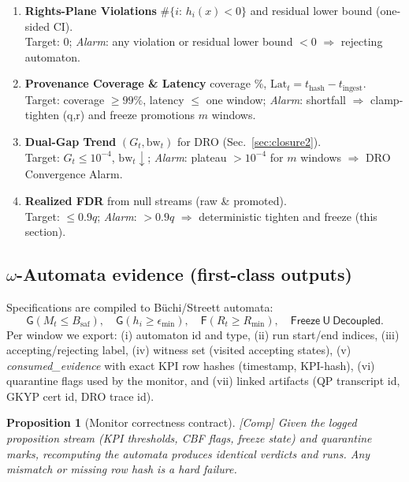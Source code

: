 \documentclass[10pt]{article}
\newcommand{\cutq}{q}
\newcommand{\layertag}[1]{\textup{[#1]}}
\newtheorem{proposition}{Proposition}
\begin{document}
\begin{constbox}
\begin{enumerate}[leftmargin=*]
Target: $0$ chatter; \emph{Alarm}: any violation $\Rightarrow$ switching-stability action (Sec.~\ref{thm:switch-stab}).
\item \textbf{Rights-Plane Violations} $\#\{i:\,h_i(x)<0\}$ and residual lower bound (one-sided CI). \\
Target: $0$; \emph{Alarm}: any violation or residual lower bound $<0$ $\Rightarrow$ rejecting automaton.
\item \textbf{Provenance Coverage \& Latency} coverage \%, $\mathrm{Lat}_t=t_{\text{hash}}{-}t_{\text{ingest}}$. \\
Target: coverage $\ge99\%$, latency $\le$ one window; \emph{Alarm}: shortfall $\Rightarrow$ clamp-tighten (q,r) and freeze promotions $m$ windows.
\item \textbf{Dual-Gap Trend} $(G_t,\mathrm{bw}_t)$ for DRO (Sec.~\ref{sec:closure2}). \\
Target: $G_t\le 10^{-4}$, $\mathrm{bw}_t\downarrow$; \emph{Alarm}: plateau $>10^{-4}$ for $m$ windows $\Rightarrow$ \textsf{DRO Convergence Alarm}.
\item \textbf{Realized FDR} from null streams (raw \& promoted). \\
Target: $\le 0.9\cutq$; \emph{Alarm}: $>0.9\cutq$ $\Rightarrow$ deterministic tighten and freeze (this section).
\end{enumerate}
\end{constbox}

\subsection*{$\omega$-Automata evidence (first-class outputs)}
Specifications are compiled to Büchi/Streett automata:
\[
\textsf{G}(M_t\!\le\!B_{\mathrm{saf}}),\quad
\textsf{G}(h_i\!\ge\!\epsilon_{\min}),\quad
\textsf{F}(R_t\!\ge\!R_{\min}),\quad
\textsf{Freeze}\ \textsf{U}\ \textsf{Decoupled}.
\]
Per window we export:
(i) automaton id and type, (ii) run start/end indices, (iii) accepting/rejecting label, (iv) witness set (visited accepting states), (v) \emph{consumed\_evidence} with exact KPI row hashes (timestamp, KPI-hash), (vi) quarantine flags used by the monitor, and (vii) linked artifacts (QP transcript id, GKYP cert id, DRO trace id).

\begin{proposition}[Monitor correctness contract]\label{prop:omega-contract}
\emph{\layertag{Comp}}
Given the logged proposition stream (KPI thresholds, CBF flags, freeze state) and \textsf{quarantine} marks, recomputing the automata produces identical verdicts and runs. Any mismatch or missing row hash is a hard failure.
\end{proposition}
\end{document}
